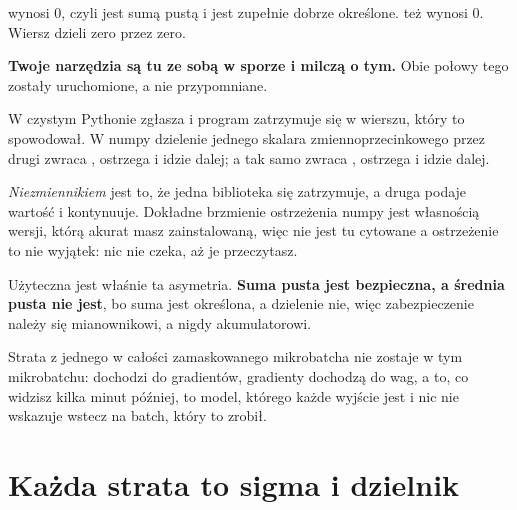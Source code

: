 \begin{fr}
\begin{ansblock}
 wynosi $0$, czyli jest sumą pustą i jest zupełnie dobrze
określone.  też wynosi $0$. Wiersz dzieli zero przez zero.
\end{ansblock}

\begin{warning}
\textbf{Twoje narzędzia są tu ze sobą w sporze i milczą o tym.} Obie połowy
tego zostały uruchomione, a nie przypomniane.

W czystym Pythonie  zgłasza  i program
zatrzymuje się w wierszu, który to spowodował. W numpy dzielenie jednego
skalara zmiennoprzecinkowego przez drugi zwraca , ostrzega i idzie
dalej; a  tak samo zwraca , ostrzega i
idzie dalej.

\emph{Niezmiennikiem} jest to, że jedna biblioteka się zatrzymuje, a druga
podaje wartość i kontynuuje. Dokładne brzmienie ostrzeżenia numpy jest
własnością wersji, którą akurat masz zainstalowaną, więc nie jest tu cytowane
\dash{} a ostrzeżenie to nie wyjątek: nic nie czeka, aż je przeczytasz.
\end{warning}

\begin{aibox}
Użyteczna jest właśnie ta asymetria. \textbf{Suma pusta jest bezpieczna, a
średnia pusta nie jest}, bo suma jest określona, a dzielenie nie, więc
zabezpieczenie należy się mianownikowi, a nigdy akumulatorowi.

Strata  z jednego w całości zamaskowanego mikrobatcha nie zostaje w
tym mikrobatchu: dochodzi do gradientów, gradienty dochodzą do wag, a to, co
widzisz kilka minut później, to model, którego każde wyjście jest  i
nic nie wskazuje wstecz na batch, który to zrobił.
\end{aibox}
\end{fr}

\section{Każda strata to sigma i dzielnik}
\label{sec:F04-loss}

